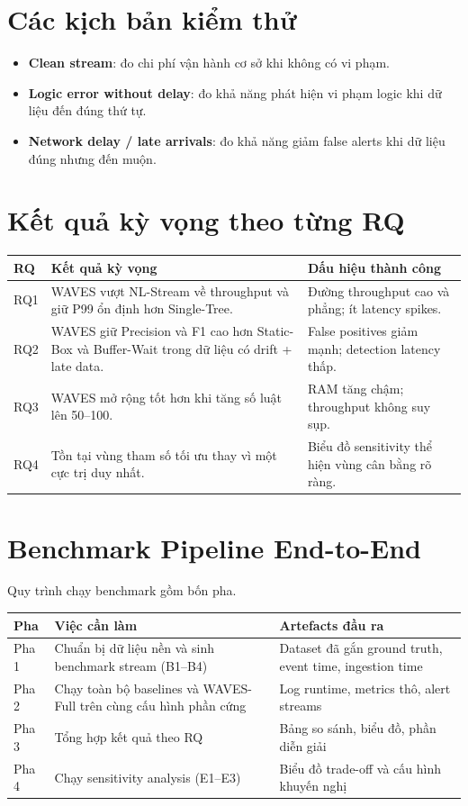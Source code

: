 \section{Các kịch bản kiểm thử}

\begin{itemize}
  \item \textbf{Clean stream}: đo chi phí vận hành cơ sở khi không có vi phạm.
  \item \textbf{Logic error without delay}: đo khả năng phát hiện vi phạm logic khi dữ liệu đến đúng thứ tự.
  \item \textbf{Network delay / late arrivals}: đo khả năng giảm false alerts khi dữ liệu đúng nhưng đến muộn.
\end{itemize}

\section{Kết quả kỳ vọng theo từng RQ}

{\small
\begin{longtable}{|L{0.10\textwidth}|L{0.36\textwidth}|L{0.44\textwidth}|}
\hline
\textbf{RQ} & \textbf{Kết quả kỳ vọng} & \textbf{Dấu hiệu thành công} \\
\hline
RQ1 & WAVES vượt NL-Stream về throughput và giữ P99 ổn định hơn Single-Tree. & Đường throughput cao và phẳng; ít latency spikes. \\
\hline
RQ2 & WAVES giữ Precision và F1 cao hơn Static-Box và Buffer-Wait trong dữ liệu có drift + late data. & False positives giảm mạnh; detection latency thấp. \\
\hline
RQ3 & WAVES mở rộng tốt hơn khi tăng số luật lên 50--100. & RAM tăng chậm; throughput không suy sụp. \\
\hline
RQ4 & Tồn tại vùng tham số tối ưu thay vì một cực trị duy nhất. & Biểu đồ sensitivity thể hiện vùng cân bằng rõ ràng. \\
\hline
\end{longtable}
}

\section{Benchmark Pipeline End-to-End}

Quy trình chạy benchmark gồm bốn pha.

{\small
\begin{longtable}{|L{0.12\textwidth}|L{0.40\textwidth}|L{0.38\textwidth}|}
\hline
\textbf{Pha} & \textbf{Việc cần làm} & \textbf{Artefacts đầu ra} \\
\hline
Pha 1 & Chuẩn bị dữ liệu nền và sinh benchmark stream (B1--B4) & Dataset đã gắn ground truth, event time, ingestion time \\
\hline
Pha 2 & Chạy toàn bộ baselines và WAVES-Full trên cùng cấu hình phần cứng & Log runtime, metrics thô, alert streams \\
\hline
Pha 3 & Tổng hợp kết quả theo RQ & Bảng so sánh, biểu đồ, phần diễn giải \\
\hline
Pha 4 & Chạy sensitivity analysis (E1--E3) & Biểu đồ trade-off và cấu hình khuyến nghị \\
\hline
\end{longtable}
}
